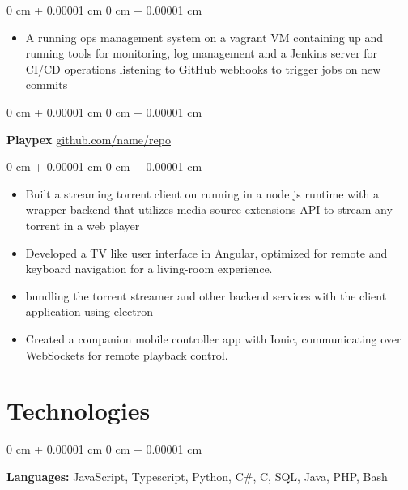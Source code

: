 \documentclass[10pt, letterpaper]{article}
\newenvironment{highlights}{
    \begin{itemize}[
        topsep=0.10 cm,
        parsep=0.10 cm,
        partopsep=0pt,
        itemsep=0pt,
        leftmargin=0 cm + 10pt
    ]
}{
    \end{itemize}
} %
\newenvironment{onecolentry}{
    \begin{adjustwidth}{
        0 cm + 0.00001 cm
    }{
        0 cm + 0.00001 cm
    }
}{
    \end{adjustwidth}
} %
\newenvironment{twocolentry}[2][]{
    \onecolentry
    \def\secondColumn{#2}
    \setcolumnwidth{\fill, 4.5 cm}
    \begin{paracol}{2}
}{
    \switchcolumn \raggedleft \secondColumn
    \end{paracol}
    \endonecolentry
} %
\begin{document}
        \vspace{0.10 cm}
        \begin{onecolentry}
            \begin{highlights}
               \item A running ops management system on a vagrant VM containing up and running tools for monitoring, log management and a Jenkins server for CI/CD operations listening to GitHub webhooks to trigger jobs on new commits

            \end{highlights}
        \end{onecolentry}


        \vspace{0.2 cm}

        \begin{twocolentry}{
            \href{https://github.com/sinaatalay/rendercv}{github.com/name/repo}
        }
            \textbf{Playpex}\end{twocolentry}

        \vspace{0.10 cm}
        \begin{onecolentry}
            \begin{highlights}
            \item Built a streaming torrent client on running in a node js runtime with a wrapper backend that utilizes media source extensions API to stream any torrent in a web player
            \item Developed a TV like user interface in Angular, optimized for remote and keyboard navigation for a living-room experience.
            \item bundling the torrent streamer and other backend services with the client application using electron 
            \item Created a companion mobile controller app with Ionic, communicating over WebSockets for remote playback control.
                \end{highlights}
        \end{onecolentry}

    
    \section{Technologies}



        
        \begin{onecolentry}
            \textbf{Languages:} JavaScript, Typescript, Python, C\#, C, SQL, Java, PHP, Bash
        \end{onecolentry}
\end{document}
